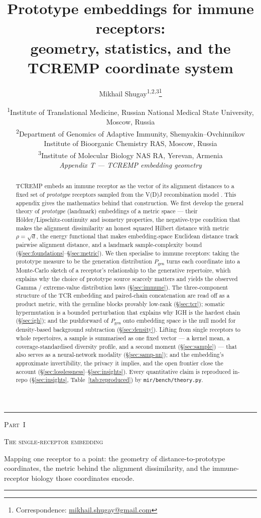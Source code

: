 \documentclass[11pt]{article}
\title{Prototype embeddings for immune receptors:\\
  geometry, statistics, and the {\normalfont\scshape TCREMP} coordinate system}
\author{Mikhail Shugay\textsuperscript{1,2,3}\thanks{Correspondence:
  \href{mailto:mikhail.shugay@gmail.com}{mikhail.shugay@gmail.com}}}
\date{%
  \small
  \textsuperscript{1}Institute of Translational Medicine, Russian National Medical State University, Moscow, Russia\\
  \textsuperscript{2}Department of Genomics of Adaptive Immunity, Shemyakin--Ovchinnikov Institute of Bioorganic Chemistry RAS, Moscow, Russia\\
  \textsuperscript{3}Institute of Molecular Biology NAS RA, Yerevan, Armenia\\[6pt]
  \normalsize\textit{Appendix T --- {\normalfont\scshape TCREMP} embedding geometry}%
}
\theoremstyle{oldplain}
\theoremstyle{oldrem}
\newcommand{\Pgen}{P_{\mathrm{gen}}}
\newcommand{\code}[1]{\texttt{#1}}
\newcommand{\apppart}[3]{%
  \par\addvspace{2.4em}%
  {\centering
    {\color{cGray}\rule{0.45\linewidth}{0.4pt}}\par\vspace{0.7em}%
    {\scshape\large Part~#1}\par\vspace{0.25em}%
    {\scshape\LARGE #2}\par\vspace{0.5em}%
    {\itshape\small\parbox{0.78\linewidth}{\centering #3}\par}\vspace{0.65em}%
    {\color{cGray}\rule{0.45\linewidth}{0.4pt}}\par
  }%
  \addvspace{1.8em}\par\nobreak
}
\begin{document}
\maketitle

\begin{abstract}
\noindent
{\scshape TCREMP} \cite{Kremlyakova2025} embeds an immune receptor as the vector of its alignment
distances to a fixed set of \emph{prototype} receptors sampled from the V(D)J recombination model
\cite{Murugan2012,Sethna2019}. This appendix gives the mathematics behind that construction. We first
develop the general theory of \emph{prototype} (landmark) embeddings of a metric space --- their
H\"older/Lipschitz-continuity and isometry properties, the negative-type condition that makes the
alignment dissimilarity an honest squared Hilbert distance \cite{Schoenberg1938} with metric $\rho=\sqrt d$,
the energy functional that makes
embedding-space Euclidean distance track pairwise alignment distance, and a landmark sample-complexity
bound (\S\ref{sec:foundations}--\S\ref{sec:metric}). We then specialise to immune receptors: taking the
prototype measure to be the generation distribution $\Pgen$ turns each coordinate into a Monte-Carlo
sketch of a receptor's relationship to the generative repertoire, which explains why the choice of
prototype source scarcely matters and yields the observed Gamma / extreme-value distribution laws
(\S\ref{sec:immune}). The three-component structure of the {\scshape TCR} embedding and paired-chain
concatenation are read off as a product metric, with the germline blocks provably low-rank
(\S\ref{sec:tcr}); somatic hypermutation is a bounded perturbation that explains why {\scshape IGH} is
the hardest chain (\S\ref{sec:igh}); and the pushforward of $\Pgen$ onto embedding space is the null
model for density-based background subtraction (\S\ref{sec:density}). Lifting from single receptors to whole
repertoires, a sample is summarised as one fixed vector --- a kernel mean, a coverage-standardised diversity
profile, and a second moment (\S\ref{sec:sample}) --- that also serves as a neural-network modality
(\S\ref{sec:samp-nn}); and the embedding's approximate invertibility, the privacy it implies, and the open
frontier close the account (\S\ref{sec:losslessness}--\S\ref{sec:insights}). Every quantitative claim is
reproduced in-repo (\S\ref{sec:insights}, Table~\ref{tab:reproduced}) by \code{mir/bench/theory.py}.
\end{abstract}

\apppart{I}{The single-receptor embedding}{Mapping one receptor to a point: the geometry of
distance-to-prototype coordinates, the metric behind the alignment dissimilarity, and the immune-receptor
biology those coordinates encode.}
\end{document}
